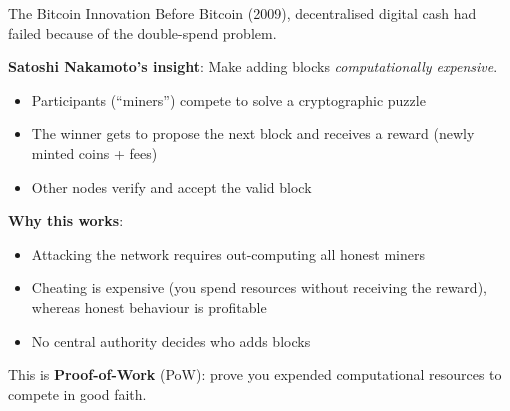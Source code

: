 \documentclass[10pt]{beamer}
\newcommand{\highlight}[1]{\textcolor{AccentOrange}{\textbf{#1}}}
\begin{document}
\begin{frame}{The Bitcoin Innovation}
  Before Bitcoin (2009), decentralised digital cash had failed because of the double-spend problem.
  
  \vspace{1em}
  \textbf{Satoshi Nakamoto's insight}: Make adding blocks \textit{computationally expensive}.
  
  \vspace{0.5em}
  \begin{itemize}
    \item Participants (``miners'') compete to solve a cryptographic puzzle
    \item The winner gets to propose the next block and receives a reward (newly minted coins + fees)
    \item Other nodes verify and accept the valid block
  \end{itemize}
  
  \vspace{1em}
  \textbf{Why this works}:
  \begin{itemize}
    \item Attacking the network requires out-computing all honest miners
    \item Cheating is expensive (you spend resources without receiving the reward), whereas honest behaviour is profitable
    \item No central authority decides who adds blocks
  \end{itemize}

  \vspace{0.5em}
  This is \highlight{Proof-of-Work} (PoW): prove you expended computational resources to compete in good faith.
\end{frame}
\end{document}
